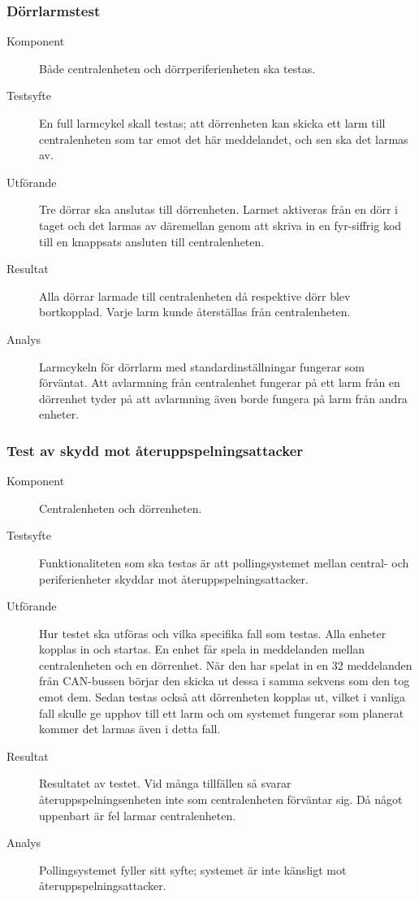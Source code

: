 \documentclass[a4paper]{article}
\begin{document}
\subsubsection{Dörrlarmstest} \label{A:dörrtest}
\begin{description}
\item[Komponent] Både centralenheten och dörrperiferienheten ska testas.

\item[Testsyfte] En full larmcykel skall testas; att dörrenheten kan skicka ett larm till centralenheten som tar emot det här meddelandet, och sen ska det larmas av.

\item[Utförande] Tre dörrar ska anslutas till dörrenheten. Larmet aktiveras från en dörr i taget och det larmas av däremellan genom att skriva in en fyr-siffrig kod till en knappsats ansluten till centralenheten.

\item[Resultat] Alla dörrar larmade till centralenheten då respektive dörr blev bortkopplad. Varje larm kunde återställas från centralenheten.

\item[Analys] Larmcykeln för dörrlarm med standardinställningar fungerar som förväntat.
Att avlarmning från centralenhet fungerar på ett larm från en dörrenhet tyder på att avlarmning även borde fungera på larm från andra enheter.
\end{description}

\subsubsection{Test av skydd mot återuppspelningsattacker}
\begin{description}
\item[Komponent] Centralenheten och dörrenheten.

\item[Testsyfte] Funktionaliteten som ska testas är att pollingsystemet mellan central- och periferienheter skyddar mot återuppspelningsattacker.

\item[Utförande] Hur testet ska utföras och vilka specifika fall som testas.
Alla enheter kopplas in och startas.
En enhet får spela in meddelanden mellan centralenheten och en dörrenhet.
När den har spelat in en 32 meddelanden från CAN-bussen börjar den skicka ut dessa i samma sekvens som den tog emot dem.
Sedan testas också att dörrenheten kopplas ut, vilket i vanliga fall skulle ge upphov till ett larm och om systemet fungerar som planerat kommer det larmas även i detta fall.

\item[Resultat] Resultatet av testet. Vid många tillfällen så svarar återuppspelningsenheten inte som centralenheten förväntar sig.
Då något uppenbart är fel larmar centralenheten.

\item[Analys] Pollingsystemet fyller sitt syfte; systemet är inte känsligt mot återuppspelningsattacker.
\end{description}
\end{document}
